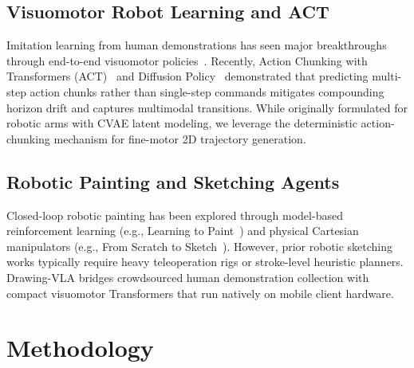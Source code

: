 \documentclass[10pt,twocolumn,letterpaper]{article}
\begin{document}
\subsection{Visuomotor Robot Learning and ACT}
Imitation learning from human demonstrations has seen major breakthroughs through end-to-end visuomotor policies~\cite{levine2016visuomotor}. Recently, Action Chunking with Transformers (ACT)~\cite{zhao2023act} and Diffusion Policy~\cite{chi2023diffusion} demonstrated that predicting multi-step action chunks rather than single-step commands mitigates compounding horizon drift and captures multimodal transitions. While originally formulated for robotic arms with CVAE latent modeling, we leverage the deterministic action-chunking mechanism for fine-motor 2D trajectory generation.

\subsection{Robotic Painting and Sketching Agents}
Closed-loop robotic painting has been explored through model-based reinforcement learning (e.g., Learning to Paint~\cite{huang2019learningtopaint}) and physical Cartesian manipulators (e.g., From Scratch to Sketch~\cite{lee2022scratchtosketch}). However, prior robotic sketching works typically require heavy teleoperation rigs or stroke-level heuristic planners. Drawing-VLA bridges crowdsourced human demonstration collection with compact visuomotor Transformers that run natively on mobile client hardware.

\section{Methodology}
\end{document}
